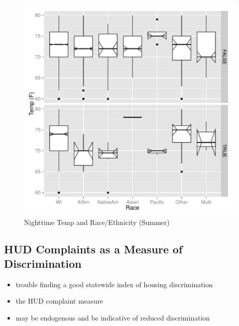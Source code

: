 \documentclass{article}
\begin{document}
\begin{figure}
\begin{center}
\caption{Nighttime Temp and Race/Ethnicity (Summer)}
\label{fig:NightRaceS}
\includegraphics{DraftEdwardsWoods-017}
\end{center}
\end{figure}
  
  \subsection{HUD Complaints as a Measure of Discrimination}\label{sec:WhyHUD}
  
  \begin{itemize}
    \item trouble finding a good statewide index of housing discrimination
    \item the HUD complaint measure
    \item may be endogenous and be indicative of reduced discrimination
  
  \end{itemize}
\end{document}
